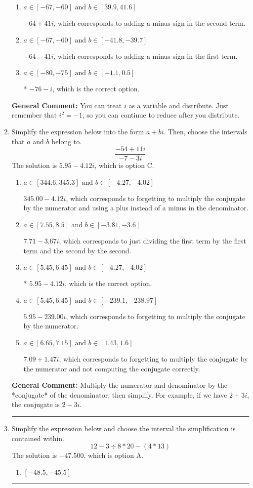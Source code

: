 \documentclass{extbook}[14pt]
\newcommand{\litem}[1]{\item #1

\rule{\textwidth}{0.4pt}}
\begin{document}
\begin{enumerate}
{\begin{enumerate}[label=\Alph*.]
 $-76 + i$, which corresponds to adding a minus sign in both terms.
\item \( a \in [-67, -60] \text{ and } b \in [39.9, 41.6] \)

 $-64 + 41 i$, which corresponds to adding a minus sign in the second term.
\item \( a \in [-67, -60] \text{ and } b \in [-41.8, -39.7] \)

 $-64 - 41 i$, which corresponds to adding a minus sign in the first term.
\item \( a \in [-80, -75] \text{ and } b \in [-1.1, 0.5] \)

* $-76 - i$, which is the correct option.
\end{enumerate}

\textbf{General Comment:} You can treat $i$ as a variable and distribute. Just remember that $i^2=-1$, so you can continue to reduce after you distribute.
}
\litem{
Simplify the expression below into the form $a+bi$. Then, choose the intervals that $a$ and $b$ belong to.
\[ \frac{-54 + 11 i}{-7 - 3 i} \]The solution is \( 5.95  - 4.12 i \), which is option C.\begin{enumerate}[label=\Alph*.]
\item \( a \in [344.6, 345.3] \text{ and } b \in [-4.27, -4.02] \)

 $345.00  - 4.12 i$, which corresponds to forgetting to multiply the conjugate by the numerator and using a plus instead of a minus in the denominator.
\item \( a \in [7.55, 8.5] \text{ and } b \in [-3.81, -3.6] \)

 $7.71  - 3.67 i$, which corresponds to just dividing the first term by the first term and the second by the second.
\item \( a \in [5.45, 6.45] \text{ and } b \in [-4.27, -4.02] \)

* $5.95  - 4.12 i$, which is the correct option.
\item \( a \in [5.45, 6.45] \text{ and } b \in [-239.1, -238.97] \)

 $5.95  - 239.00 i$, which corresponds to forgetting to multiply the conjugate by the numerator.
\item \( a \in [6.65, 7.15] \text{ and } b \in [1.43, 1.6] \)

 $7.09  + 1.47 i$, which corresponds to forgetting to multiply the conjugate by the numerator and not computing the conjugate correctly.
\end{enumerate}

\textbf{General Comment:} Multiply the numerator and denominator by the *conjugate* of the denominator, then simplify. For example, if we have $2+3i$, the conjugate is $2-3i$.
}
\litem{
Simplify the expression below and choose the interval the simplification is contained within.
\[ 12 - 3 \div 8 * 20 - (4 * 13) \]The solution is \( -47.500 \), which is option A.\begin{enumerate}[label=\Alph*.]
\item \( [-48.5, -45.5] \)


\end{enumerate}}
\end{enumerate}
\end{document}
